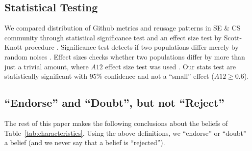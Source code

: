 \documentclass[sigconf,review,anonymous]{acmart}
\begin{document}
\subsection{Statistical Testing}

We compared distribution of Github metrics and reusage patterns in SE \& CS community through statistical significance test and an effect size test by Scott-Knott procedure \cite{mittas2013ranking, ghotra15}. Significance test detects if two populations differ merely by random noises \cite{ghotra15}. Effect sizes checks whether two populations differ by more than just a trivial amount, where $\mathit{A12}$ effect size test was used \cite{arcuri2011practical}. Our stats test are statistically significant with 95\% confidence and not a ``small'' effect ($\mathit{A12} \ge 0.6$).




  



\subsection{``Endorse'' and ``Doubt'', but not ``Reject''}\label{model}

The rest of this paper makes the following conclusions about the beliefs of Table~\ref{tab:characteristics}. Using the above definitions, we ``endorse'' or ``doubt'' a belief (and we never say that a belief is ``rejected''). 
\end{document}
